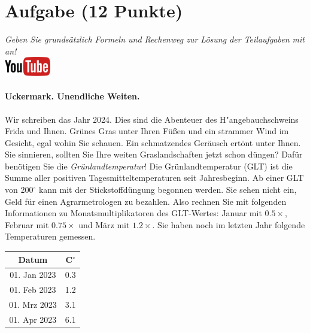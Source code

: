 \documentclass[a4paper, 9pt]{scrartcl}\usepackage[]{graphicx}\usepackage[]{xcolor}
\begin{document}
\clearpage

\section{Aufgabe \hfill (12 Punkte)}

\textit{Geben Sie grunds{\"a}tzlich Formeln und Rechenweg zur L{\"o}sung der
  Teilaufgaben mit an!} \\[1Ex]

\hfill\href{https://youtu.be/fiWGgCX-cE4}{\includegraphics[width =
  2cm]{img/youtube}} %
\hspace{2Ex}



\paragraph{Uckermark. Unendliche Weiten.}



Wir schreiben das Jahr 2024. Dies sind die Abenteuer
des H{"a}ngebauchschweins Frida und Ihnen. Gr{\"u}nes Gras unter Ihren F{\"u}{\ss}en und
ein strammer Wind im Gesicht, egal wohin Sie schauen. Ein schmatzendes
Ger{\"a}usch ert{\"o}nt unter Ihnen. Sie sinnieren, sollten Sie Ihre weiten
Graslandschaften jetzt schon d{\"u}ngen?  Daf{\"u}r ben{\"o}tigen Sie die
\textit{Gr{\"u}nlandtemperatur}! Die Gr{\"u}nlandtemperatur (GLT) ist die Summe aller
positiven Tagesmitteltemperaturen seit Jahresbeginn. Ab einer GLT von
200$^\circ$ kann mit der Stickstoffd{\"u}ngung begonnen werden. Sie sehen nicht
ein, Geld f{\"u}r einen Agrarmetrologen zu bezahlen. Also rechnen Sie mit
folgenden Informationen zu Monatsmultiplikatoren des GLT-Wertes: Januar mit
$0.5\times$, Februar mit $0.75\times$ und M{\"a}rz mit
$1.2\times$. Sie haben noch im letzten Jahr folgende Temperaturen
gemessen.

\begin{center}
\begin{tabular}{cc}
  \toprule
  Datum & C$^\circ$ \\
  \midrule
  01. Jan 2023 & 0.3\\
  01. Feb 2023 & 1.2\\
  01. Mrz 2023 & 3.1\\
  01. Apr 2023 & 6.1\\
  \bottomrule
\end{tabular}
\end{center}
\end{document}
